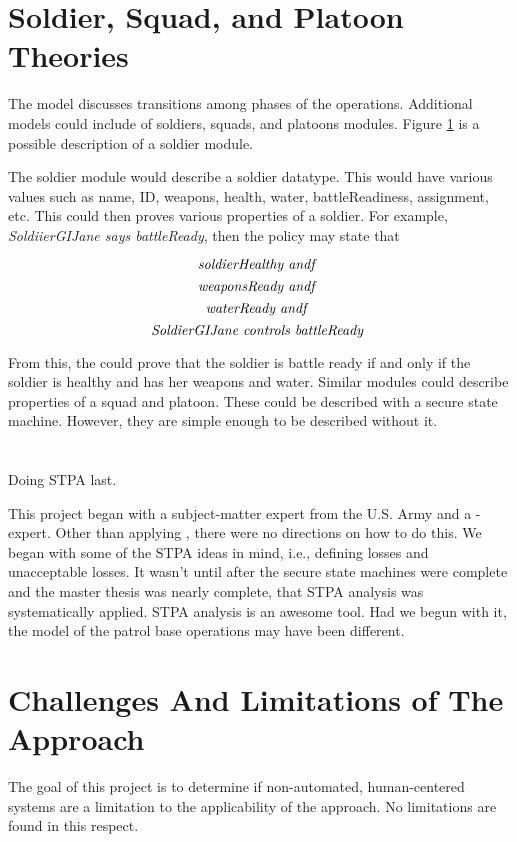 \documentclass[../../main/main.tex]{subfiles}
\begin{document}
 \section{Soldier, Squad, and Platoon Theories}
The model discusses transitions among phases of the operations.  Additional models could include of soldiers, squads, and platoons modules.  Figure \ref{} is a possible description of a soldier module.  






The soldier module would describe a soldier datatype.  This would have various values such as name, ID, weapons, health, water, battleReadiness, assignment, etc.   This could then proves various properties of a soldier.  For example,  \textit{SoldiierGIJane  says battleReady}, then the policy may state that


 \[ \text{\textit{soldierHealthy andf }} \] 
  \[ \text{\textit{weaponsReady andf }} \] 
 \[ \text{\textit{waterReady andf }} \] 
\[ \text{\textit{SoldierGIJane controls battleReady }} \]

From this, the  could prove that the soldier is battle ready if and only if the soldier is healthy and has her weapons and water.  Similar modules could describe properties of a squad and platoon.  These could be described with a secure state machine.  However, they are simple enough to be described without it.


\section{}\label{sec:discussion}
Doing STPA last.

This project began with a subject-matter expert from the U.S. Army and a -expert.  Other than applying , there were no directions on how to do this.  We began with some of the STPA ideas in mind, i.e., defining losses and unacceptable losses.  It wasn't until after the secure state machines were complete and the master thesis was nearly complete, that STPA analysis was systematically applied.  STPA analysis is an awesome tool.  Had we begun with it, the model of the patrol base operations may have been different.

\section{Challenges And Limitations of The Approach}\label{missionaccomplished}
The goal of this project is to determine if non-automated, human-centered systems are a limitation to the applicability of the  approach.  No limitations are found in this respect.  
\end{document}
